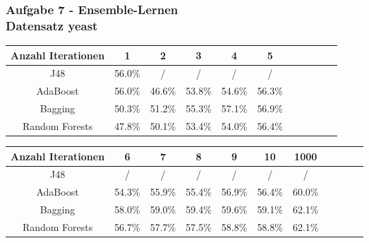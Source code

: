 \documentclass[accentcolor=tud10b,colorbacktitle,inverttitle,landscape,german,presentation,t]{tudbeamer}
\begin{document}
    \begin{frame}[t]
    \frametitle{Aufgabe 7 - Ensemble-Lernen\\ Datensatz yeast}
        \begin{tabular}{|c||c|c|c|c|c|c|c|c|c|c|}
        \hline 
        Anzahl Iterationen & 1 & 2 & 3 & 4 & 5 \\ 
        \hline 
        J48 & 56.0\% & / & / & / & / \\ 
        \hline 
        AdaBoost & 56.0\% & 46.6\% & 53.8\% & 54.6\% & 56.3\% \\ 
        \hline 
        Bagging & 50.3\% & 51.2\% & 55.3\% & 57.1\% & 56.9\% \\ 
        \hline 
        Random Forests & 47.8\% & 50.1\% & 53.4\% & 54.0\% & 56.4\% \\ 
        \hline 
        \end{tabular}
        
        \begin{tabular}{|c||c|c|c|c|c|c|c|c|c|c|}
        \hline 
        Anzahl Iterationen & 6 & 7 & 8 & 9 & 10 & 1000\\ 
        \hline 
        J48 & / & / & / & / & / & / \\ 
        \hline 
        AdaBoost & 54.3\% & 55.9\% & 55.4\% & 56.9\% & 56.4\% & 60.0\% \\ 
        \hline 
        Bagging & 58.0\% & 59.0\% & 59.4\% & 59.6\% & 59.1\% & 62.1\% \\ 
        \hline 
        Random Forests & 56.7\% & 57.7\% & 57.5\% & 58.8\% & 58.8\% & 62.1\% \\ 
        \hline 
        \end{tabular} 
    \end{frame}   
    
\end{document}
